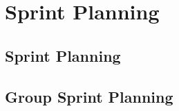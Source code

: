 \chapter{Sprint Planning}\label{chap:s4_sprintplanning}

\section{\bdtitle Sprint Planning}\label{sec:S4_bd}

\section{Group Sprint Planning}\label{sec:S4_group}